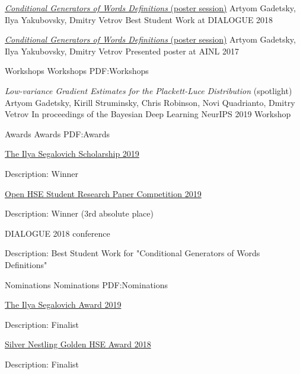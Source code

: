 \documentclass[letterpaper,MMMyyyy,nonstopmode]{simpleresumecv}
\begin{document}
\begin{Body}
\Gap
\Item
\href{http://www.dialog-21.ru/en/}{\textit{Conditional Generators of Words Definitions} (poster session)}
\Item
Artyom Gadetsky, Ilya Yakubovsky, Dmitry Vetrov
\Item
Best Student Work at DIALOGUE 2018

\Gap
\Item
\href{http://ainlconf.ru/2017}{\textit{Conditional Generators of Words Definitions} (poster session)}
\Item
Artyom Gadetsky, Ilya Yakubovsky, Dmitry Vetrov
\Item
Presented poster at AINL 2017

\Gap
\SubSection
{Workshops}
{Workshops}
{PDF:Workshops}

\Item
\textit{Low-variance Gradient Estimates for the Plackett-Luce Distribution} (spotlight)
\Item
Artyom Gadetsky, Kirill Struminsky, Chris Robinson, Novi Quadrianto, Dmitry Vetrov
\Item
In proceedings of the Bayesian Deep Learning NeurIPS 2019 Workshop

\Section
{Awards}
{Awards}
{PDF:Awards}

\BulletItem
\href{https://yandex.com/scholarships/students}{The Ilya Segalovich Scholarship 2019}
\begin{Detail}
\Item
Description: Winner
\end{Detail}

\BulletItem
\href{https://nirs.hse.ru/nirs/}{Open HSE Student Research Paper Competition 2019}
\begin{Detail}
\Item
Description: Winner (3rd absolute place)
\end{Detail}

\BulletItem
DIALOGUE 2018 conference
\begin{Detail}
\Item
Description: Best Student Work for "Conditional Generators of Words Definitions"
\end{Detail}


\Section
{Nominations}
{Nominations}
{PDF:Nominations}

\BulletItem
\href{https://yandex.com/scholarships/scholars}{The Ilya Segalovich Award 2019}
\begin{Detail}
\Item
Description: Finalist
\end{Detail}

\BulletItem
\href{https://www.hse.ru/gold/cm/silver/2018/gadetsky}{Silver Nestling Golden HSE Award 2018}
\begin{Detail}
\Item
Description: Finalist
\end{Detail}


\end{Body}
\end{document}
